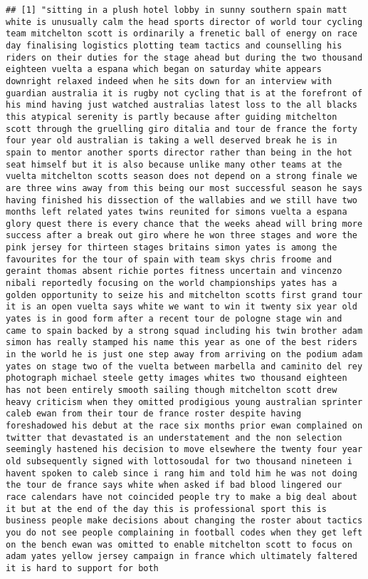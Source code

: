 \documentclass[]{article}
\begin{document}
\begin{verbatim}
## [1] "sitting in a plush hotel lobby in sunny southern spain matt white is unusually calm the head sports director of world tour cycling team mitchelton scott is ordinarily a frenetic ball of energy on race day finalising logistics plotting team tactics and counselling his riders on their duties for the stage ahead but during the two thousand eighteen vuelta a espana which began on saturday white appears downright relaxed indeed when he sits down for an interview with guardian australia it is rugby not cycling that is at the forefront of his mind having just watched australias latest loss to the all blacks this atypical serenity is partly because after guiding mitchelton scott through the gruelling giro ditalia and tour de france the forty four year old australian is taking a well deserved break he is in spain to mentor another sports director rather than being in the hot seat himself but it is also because unlike many other teams at the vuelta mitchelton scotts season does not depend on a strong finale we are three wins away from this being our most successful season he says having finished his dissection of the wallabies and we still have two months left related yates twins reunited for simons vuelta a espana glory quest there is every chance that the weeks ahead will bring more success after a break out giro where he won three stages and wore the pink jersey for thirteen stages britains simon yates is among the favourites for the tour of spain with team skys chris froome and geraint thomas absent richie portes fitness uncertain and vincenzo nibali reportedly focusing on the world championships yates has a golden opportunity to seize his and mitchelton scotts first grand tour it is an open vuelta says white we want to win it twenty six year old yates is in good form after a recent tour de pologne stage win and came to spain backed by a strong squad including his twin brother adam simon has really stamped his name this year as one of the best riders in the world he is just one step away from arriving on the podium adam yates on stage two of the vuelta between marbella and caminito del rey photograph michael steele getty images whites two thousand eighteen has not been entirely smooth sailing though mitchelton scott drew heavy criticism when they omitted prodigious young australian sprinter caleb ewan from their tour de france roster despite having foreshadowed his debut at the race six months prior ewan complained on twitter that devastated is an understatement and the non selection seemingly hastened his decision to move elsewhere the twenty four year old subsequently signed with lottosoudal for two thousand nineteen i havent spoken to caleb since i rang him and told him he was not doing the tour de france says white when asked if bad blood lingered our race calendars have not coincided people try to make a big deal about it but at the end of the day this is professional sport this is business people make decisions about changing the roster about tactics you do not see people complaining in football codes when they get left on the bench ewan was omitted to enable mitchelton scott to focus on adam yates yellow jersey campaign in france which ultimately faltered it is hard to support for both 
\end{verbatim}
\end{document}
